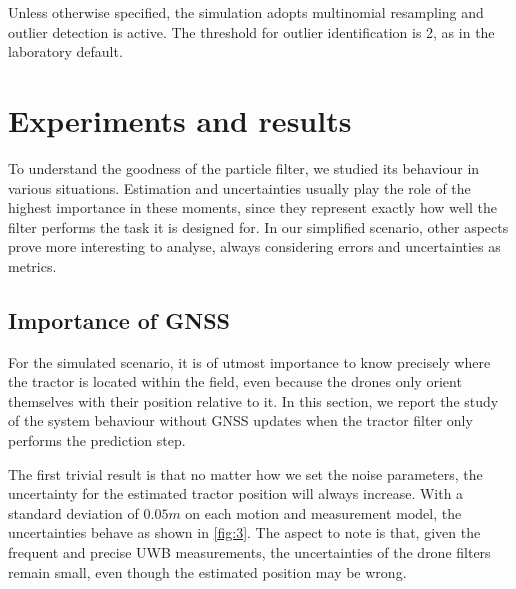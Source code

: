 \documentclass[letterpaper,twocolumn,10pt]{article}
\begin{document}
Unless otherwise specified, the simulation adopts multinomial resampling and outlier detection is active. The threshold for outlier identification is 2, as in the laboratory default.

\section{Experiments and results}
\label{sec:4}
To understand the goodness of the particle filter, we studied its behaviour in various situations. Estimation and uncertainties usually play the role of the highest importance in these moments, since they represent exactly how well the filter performs the task it is designed for. In our simplified scenario, other aspects prove more interesting to analyse, always considering errors and uncertainties as metrics.

\subsection*{Importance of GNSS}
For the simulated scenario, it is of utmost importance to know precisely where the tractor is located within the field, even because the drones only orient themselves with their position relative to it. In this section, we report the study of the system behaviour without GNSS updates when the tractor filter only performs the prediction step. 

The first trivial result is that no matter how we set the noise parameters, the uncertainty for the estimated tractor position will always increase. With a standard deviation of $0.05m$ on each motion and measurement model, the uncertainties behave as shown in \autoref{fig:3}. The aspect to note is that, given the frequent and precise UWB measurements, the uncertainties of the drone filters remain small, even though the estimated position may be wrong.
\end{document}
